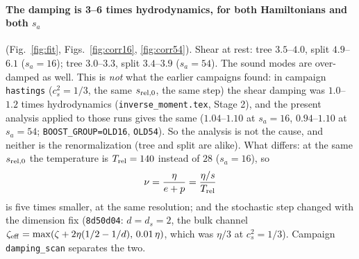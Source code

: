 \documentclass[11pt,aps,preprint,nofootinbib,superscriptaddress,tightenlines]{revtex4-2}
\def\st{\begin{equation}}
\def\stp{\end{equation}}
\def\Fig#1{Fig.~\ref{#1}}
\let\oldparagraph\paragraph
\renewcommand{\paragraph}{\par\bigskip\oldparagraph}
\begin{document}
\paragraph{The damping is 3--6 times hydrodynamics, for both Hamiltonians and both $s_a$} (\Fig{fig:fit}, Figs.~\ref{fig:corr16},
\ref{fig:corr54}).  Shear at rest: tree $3.5$--$4.0$, split $4.9$--$6.1$ ($s_a=16$); tree $3.0$--$3.3$, split $3.4$--$3.9$ ($s_a=54$).
The sound modes are over-damped as well.  This is \emph{not} what the earlier campaigns found: in campaign \texttt{hastings}
($c_s^2=1/3$, the same $s_{\rm rel,0}$, the same step) the shear damping was $1.0$--$1.2$ times hydrodynamics (\texttt{inverse\_moment.tex},
Stage 2), and the present analysis applied to those runs gives the same ($1.04$--$1.10$ at $s_a=16$, $0.94$--$1.10$ at $s_a=54$;
\texttt{BOOST\_GROUP=OLD16}, \texttt{OLD54}).  So the analysis is not the cause, and neither is the renormalization (tree and split are
alike).  What differs: at the same $s_{\rm rel,0}$ the temperature is $T_{\rm rel}=140$ instead of $28$ ($s_a=16$), so
\st
\nu=\frac{\eta}{e+p}=\frac{\eta/s}{T_{\rm rel}}
\stp
is five times smaller, at the same resolution; and the stochastic step changed with the dimension fix (\texttt{8d50d04}: $d=d_s=2$,
the bulk channel $\zeta_{\rm eff}=\max(\zeta+2\eta(1/2-1/d),\,0.01\,\eta)$, which was $\eta/3$ at $c_s^2=1/3$).  Campaign
\texttt{damping\_scan} separates the two.
\end{document}
